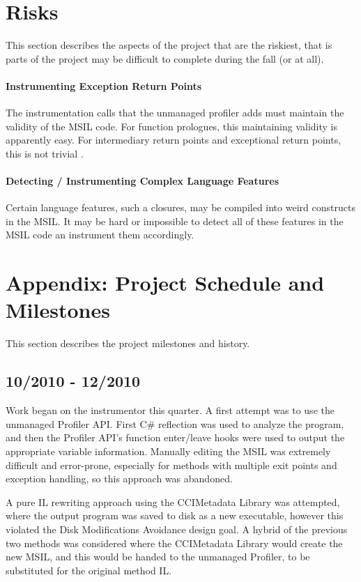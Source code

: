 \documentclass{article}
\begin{document}
\section{Risks}
This section describes the aspects of the project that are the riskiest, that is parts of the project may be difficult to complete during the fall (or at all).

\paragraph{Instrumenting Exception Return Points}
The instrumentation calls that the unmanaged profiler adds must maintain the validity of the MSIL code. For function prologues, this maintaining validity is apparently easy. For intermediary return points and exceptional return points, this is not trivial \cite{Mikunov:2003:Online}.

\paragraph{Detecting / Instrumenting Complex Language Features}
Certain language features, such a closures, may be compiled into weird
constructs in the MSIL. It may be hard or impossible to detect all of
these features in the MSIL code an instrument them accordingly.

\appendix

\section{Appendix: Project Schedule and Milestones}
This section describes the project milestones and history.

\subsection{10/2010 - 12/2010}
Work began on the instrumentor this quarter. A first attempt was to use the unmanaged Profiler API. First C\# reflection was used to analyze the program, and then the Profiler API's function enter/leave hooks were used to output the appropriate variable information. Manually editing the MSIL was extremely difficult and error-prone, especially for methods with multiple exit points and exception handling, so this approach was abandoned.

A pure IL rewriting approach using the CCIMetadata Library was attempted, where the output program was saved to disk as a new executable, however this violated the Disk Modifications Avoidance design goal. A hybrid of the previous two methods was considered where the CCIMetadata Library would create the new MSIL, and this would be handed to the unmanaged Profiler, to be substituted for the original method IL.
\end{document}
